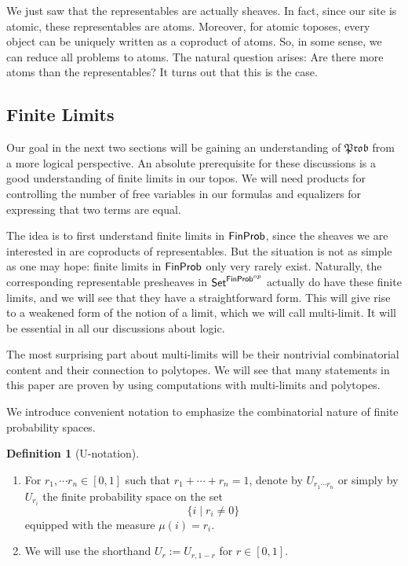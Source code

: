 \documentclass[a4paper]{amsproc}
\theoremstyle{plain}
\theoremstyle{definition}
\newtheorem{definition}[theorem]{Definition}
\theoremstyle{remark}
\numberwithin{equation}{section}
\newcommand{\Set}{\textup{\textsf{Set}}}
\newcommand{\FinProb}{\textup{\textsf{FinProb}}}
\newcommand{\Prob}{\mathfrak{Prob}}
\begin{document}
We just saw that the representables are actually sheaves. In fact, since our site is atomic, these representables are atoms. Moreover, for atomic toposes, every object can be uniquely written as a coproduct of atoms. So, in some sense, we can reduce all problems to atoms. The natural question arises: Are there more atoms than the representables? It turns out that this is the case.



\subsection{Finite Limits}

Our goal in the next two sections will be gaining an understanding of $\Prob$ from a more logical perspective. An absolute prerequisite for these discussions is a good understanding of finite limits in our topos. We will need products for controlling the number of free variables in our formulas and equalizers for expressing that two terms are equal.

The idea is to first understand finite limits in $\FinProb$, since the sheaves we are interested in are coproducts of representables. But the situation is not as simple as one may hope: finite limits in $\FinProb$ only very rarely exist. Naturally, the corresponding representable presheaves in $\Set^{\FinProb^{op}}$ actually do have these finite limits, and we will see that they have a straightforward form. This will give rise to a weakened form of the notion of a limit, which we will call multi-limit. It will be essential in all our discussions about logic.

The most surprising part about multi-limits will be their nontrivial combinatorial content and their connection to polytopes. We will see that many statements in this paper are proven by using computations with multi-limits and polytopes.

We introduce convenient notation to emphasize the combinatorial nature of finite probability spaces.

\begin{definition}[U-notation] \label{U-notation}
    \mbox{}
    \begin{enumerate}
        \item For $r_1, \cdots r_n \in [0,1]$ such that $r_1 + \cdots + r_n = 1$, denote by $U_{r_1 \cdots r_n}$ or simply by $U_{r_i}$ the finite probability space on the set
        \[
        \{i \mid r_i \neq 0 \}
        \]
        equipped with the measure $\mu(i) = r_i$.
        \item We will use the shorthand $U_r := U_{r,1-r}$ for $r \in [0,1]$.
    \end{enumerate}
\end{definition}
\end{document}
